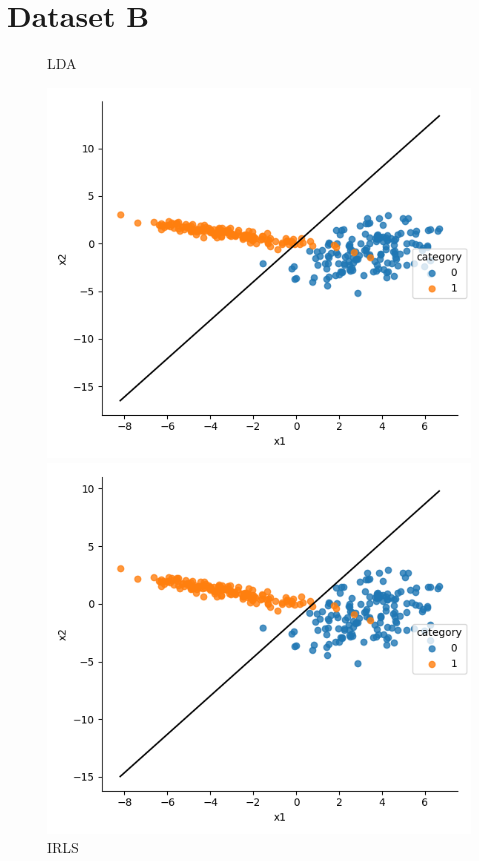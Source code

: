 \documentclass[a4paper]{article}
\begin{document}
\section{Dataset B}
\begin{figure}[h]
\centering
\begin{minipage}{0,45\textwidth}
\caption{LDA}
\includegraphics[scale=.45]{b_lda.png}
\end{minipage}
\begin{minipage}{0,45\textwidth}
\caption{IRLS}
\includegraphics[scale=.45]{b_irls.png}

\end{minipage}
\end{figure}
\end{document}
